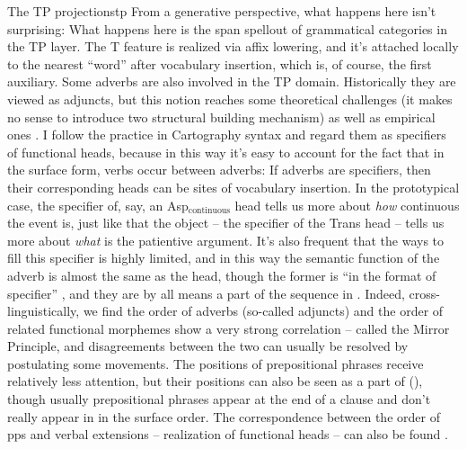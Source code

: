 \documentclass[UTF8, a4paper, oneside, scheme=plain]{ctexrep}
\newcommand*{\citepage}[1]{pp.~{#1}}
\begin{document}
\begin{theorybox}{The TP projections}{tp}
    From a generative perspective, 
    what happens here isn't surprising:
    What happens here is the span spellout of grammatical categories in the TP layer.
    The T feature is realized via affix lowering, 
    and it's attached locally to the nearest ``word'' after vocabulary insertion,
    which is, of course, the first auxiliary.
    Some adverbs are also involved in the TP domain.
    Historically they are viewed as adjuncts,
    but this notion reaches some theoretical challenges 
    (it makes no sense to introduce two structural building mechanism)
    as well as empirical ones \citep{sportiche2017fewer}.
    I follow the practice in Cartography syntax and regard them as specifiers of functional heads,
    because in this way it's easy to account for the fact that 
    in the surface form, verbs occur between adverbs:
    If adverbs are specifiers,
    then their corresponding heads can be sites of vocabulary insertion.
    In the prototypical case, 
    the specifier of, say, an Asp$_{\text{continuous}}$ head 
    tells us more about \emph{how} continuous the event is,
    just like that the object -- the specifier of the Trans head -- 
    tells us more about \emph{what} is the patientive argument.
    It's also frequent that the ways to fill this specifier is highly limited,
    and in this way the semantic function of the adverb 
    is almost the same as the head, though the former is ``in the format of specifier''
    \citep{shlonsky2010cartographic},
    and they are by all means a part of the sequence in .
    Indeed, cross-linguistically, 
    we find the order of adverbs (so-called adjuncts) and the order of related functional morphemes 
    show a very strong correlation -- called the Mirror Principle,
    and disagreements between the two can usually be resolved by postulating some movements.
    The positions of prepositional phrases receive relatively less attention,
    but their positions can also be seen as a part of 
    (\citealt[\citepage{106}]{schweikert2005order}),
    though usually prepositional phrases appear at the end of a clause 
    and don't really appear in  in the surface order.
    The correspondence between the order of \acs{pp}s and verbal extensions 
    -- realization of functional heads -- 
    can also be found \citep[\citepage{160}]{cinque2006restructuring}.
\end{theorybox}
\end{document}
